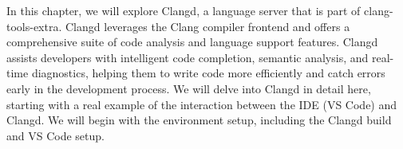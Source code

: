 In this chapter, we will explore Clangd, a language server that is part of clang-tools-extra. Clangd leverages the Clang compiler frontend and offers a comprehensive suite of code analysis and language support features. Clangd assists developers with intelligent code completion, semantic analysis, and real-time diagnostics, helping them to write code more efficiently and catch errors early in the development process. We will delve into Clangd in detail here, starting with a real example of the interaction between the IDE (VS Code) and Clangd. We will begin with the environment setup, including the Clangd build and VS Code setup.
































